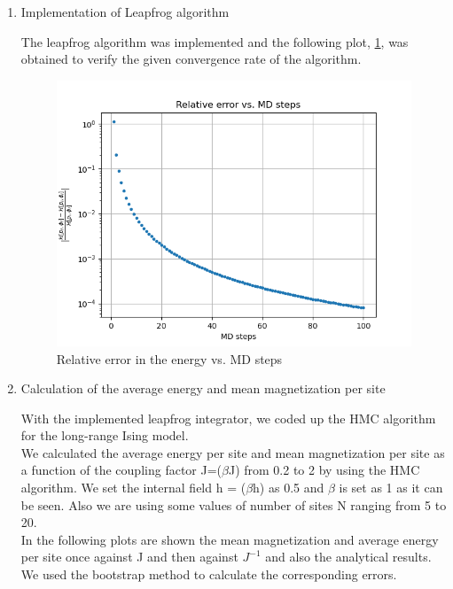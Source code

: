\documentclass{article}
\begin{document}
\begin{enumerate}
\item{Implementation of Leapfrog algorithm}

The leapfrog algorithm was implemented and the following plot, \ref{fig:lf_conv}, was obtained to verify the given convergence rate of the algorithm.
\begin{figure}[h!]
    \centering
    \includegraphics[width = .8\linewidth]{leapfrog_conv.png}
    \caption{Relative error in the energy vs. MD steps}
    \label{fig:lf_conv}
\end{figure}

\newpage

\item{Calculation of the average energy and mean magnetization per site}

With the implemented leapfrog integrator, we coded up the HMC algorithm for the long-range Ising model. \\
We calculated the average energy per site and mean magnetization per site as a function of the coupling factor J=($\beta$J) from 0.2 to 2 by using the HMC algorithm. We set the internal field h = ($\beta$h) as 0.5 and $\beta$ is set as 1 as it can be seen. Also we are using some values of number of sites N ranging from 5 to 20. \\ 
In the following plots are shown the mean magnetization and average energy per site once against J and then against $J^{-1}$ and also the analytical results. 
We used the bootstrap method to calculate the corresponding errors.


\end{enumerate}
\end{document}
